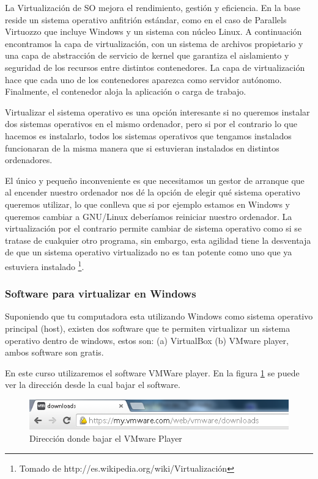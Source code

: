 \documentclass[12pt, twoside]{report}
\begin{document}
La Virtualización de SO mejora el rendimiento, gestión y eficiencia. En la base reside un sistema operativo anfitrión estándar, como en el caso de Parallels Virtuozzo que incluye Windows y un sistema con núcleo Linux. A continuación encontramos la capa de virtualización, con un sistema de archivos propietario y una capa de abstracción de servicio de kernel que garantiza el aislamiento y seguridad de los recursos entre distintos contenedores. La capa de virtualización hace que cada uno de los contenedores aparezca como servidor autónomo. Finalmente, el contenedor aloja la aplicación o carga de trabajo.

Virtualizar el sistema operativo es una opción interesante si no queremos instalar dos sistemas operativos en el mismo ordenador, pero si por el contrario lo que hacemos es instalarlo, todos los sistemas operativos que tengamos instalados funcionaran de la misma manera que si estuvieran instalados en distintos ordenadores.

El único y pequeño inconveniente es que necesitamos un gestor de arranque que al encender nuestro ordenador nos dé la opción de elegir qué sistema operativo queremos utilizar, lo que conlleva que si por ejemplo estamos en Windows y queremos cambiar a GNU/Linux deberíamos reiniciar nuestro ordenador. La virtualización por el contrario permite cambiar de sistema operativo como si se tratase de cualquier otro programa, sin embargo, esta agilidad tiene la desventaja de que un sistema operativo virtualizado no es tan potente como uno que ya estuviera instalado \footnote{Tomado de http://es.wikipedia.org/wiki/Virtualización}.

\subsubsection{Software para virtualizar en Windows}

Suponiendo que tu computadora esta utilizando Windows como sistema operativo principal (host), existen dos software que te permiten virtualizar un sistema operativo dentro de windows, estos son: (a) VirtualBox (b) VMware player, ambos software son gratis.

En este curso utilizaremos el software VMWare player. En la figura \ref{fig1004} se puede ver la dirección desde la cual bajar el software.

\begin{figure}
	\centering
	\includegraphics[width=1.0\linewidth]{direccionVMware.png}
	\caption{Dirección donde bajar el VMware Player}
	\label{fig1004}
\end{figure}
\end{document}
